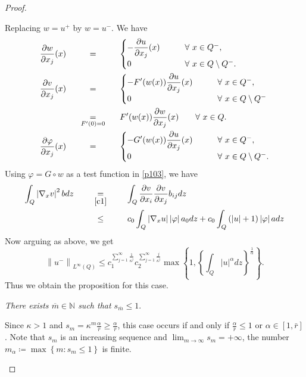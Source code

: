 \documentclass[11pt, a4paper]{article}
\numberwithin{equation}{section}
\newcommand{\coex}[2][\hphantom{longexplanation}]{%
  \underset{{#1}}{\overset{\hphantom{longexplanation}}{#2}}
}
\newcommand{\NN}{{\mathbb N}}
\newcommand{\abs}[1]{\left\lvert #1\right\rvert}
\newcommand{\norm}[1]{\left\lVert #1\right\rVert}
\begin{document}
\begin{proof}
\begin{description}[wide]
 Replacing $w=u^{+}$ by $w=u^{-}$.  We have 
 \begin{align*}
   \frac{\partial w}{\partial x_{j}}(x)
   &\coex{=} \begin{cases}
     \displaystyle -\frac{\partial u}{\partial x_{j}}(x) \qquad&{\forall~x \in Q^{-},}\\
     0&{\forall~x \in Q\setminus Q^{-}}.
   \end{cases}\\
   \frac{\partial v}{\partial x_{j}}(x)
   &\coex{=} \begin{cases}
\displaystyle - F'(w(x))\frac{\partial u}{\partial x_{j}}(x) \qquad&{\forall~x \in Q^{-},}\\
0&{\forall~x \in Q\setminus Q^{-}}
   \end{cases}\\
   &\coex[F'(0)=0]{=}
     F'(w(x))\frac{\partial w}{\partial x_{j}}(x)\qquad\forall~x \in
     Q.\\
   \frac{\partial \varphi}{\partial x_{j}}(x)
   &\coex{=}\begin{cases}
\displaystyle - G'(w(x))\frac{\partial u}{\partial x_{j}}(x)  \qquad&{\forall~x \in Q^{-},}\\
0&{\forall~x \in Q\setminus Q^{-}.}
\end{cases}
 \end{align*}
Using $\varphi = G \circ w$ as a test function  in \eqref{p103},   we
have 
\begin{align*}
  \int_{Q}\abs{\nabla_x v}^{2} bdz
  &\coex[\eqref{c1}]{=} \int_{Q}\frac{\partial v}{\partial x_{i}}
    \frac{\partial v}{\partial x_{j}}b_{ij}dz\\
  &\coex{\le} c_{0}\int_{Q}\abs{\nabla_{x} u} \abs{\varphi} a_{0}
    dz+c_{0}\int_{Q} \left(\abs{u}+1 \right)
    \abs{\varphi}a dz
\end{align*}
Now arguing as above, we get
\[
  \norm{u^{-}}_{L^{\infty}(Q)}\leq
  c_{1}^{\sum_{j=1}^{\infty}\frac{1}{\kappa^{j}}}c_{2}^{\sum_{j=1}^{\infty}\frac{j}{\kappa^{j}}}\max\left\{1,\left\{\int_{Q}\abs{u}^{\alpha}
      dz\right\}^{\frac{1}{\alpha}}\right\}.
\]
Thus we obtain the proposition for this case.
\item[Case 2.] \emph{There exists $\overline{m} \in \NN$ such that
    $s_{\overline{m}} \le 1$}.

Since $\kappa > 1$ and $s_m = \kappa^m \frac{\alpha}{\overline{r}}
\ge \frac{\alpha}{\overline{r}}$, this case occurs if and only if
$\frac{\alpha}{\overline{r}} \le 1$ or $\alpha \in [1,\bar{r}]$. Note that $s_m$ is an increasing
sequence and $\lim_{m \to \infty}
s_m = +\infty$, the number $m_{\alpha} \coloneqq \max \left\{ m \colon s_m
  \le 1 \right\}$ is finite.


\end{description}
\end{proof}
\end{document}
